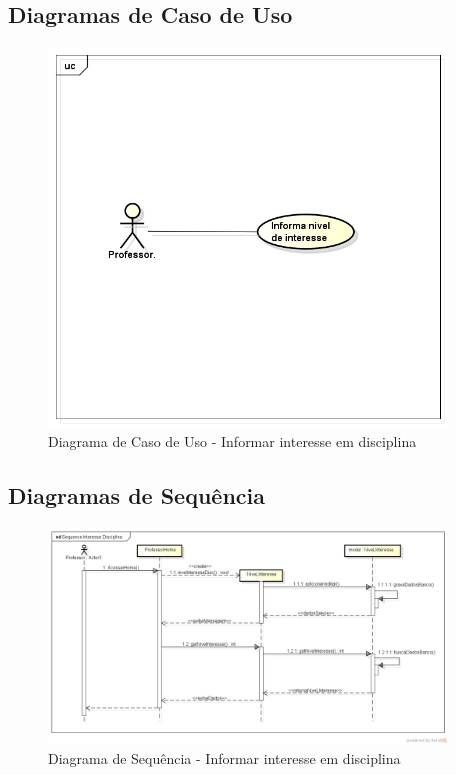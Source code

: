 \documentclass{abnt}
\begin{document}
		\subsection{Diagramas de Caso de Uso}	
		\begin{figure}[h]
			\begin{center}
				 \includegraphics[width=400px]{casoUsoInformarInteresseDisciplina}
				 \caption{Diagrama de Caso de Uso - Informar interesse em disciplina}
			\end{center}
		\end{figure}

		\FloatBarrier

		
		\subsection{Diagramas de Sequência}
		
		
		\begin{figure}[h]
					\begin{center}
						 \includegraphics[width=400px]{SequenceInteresseDisciplina}
						 \caption{Diagrama de Sequência - Informar interesse em disciplina}
					\end{center}
				\end{figure}
		
\end{document}
